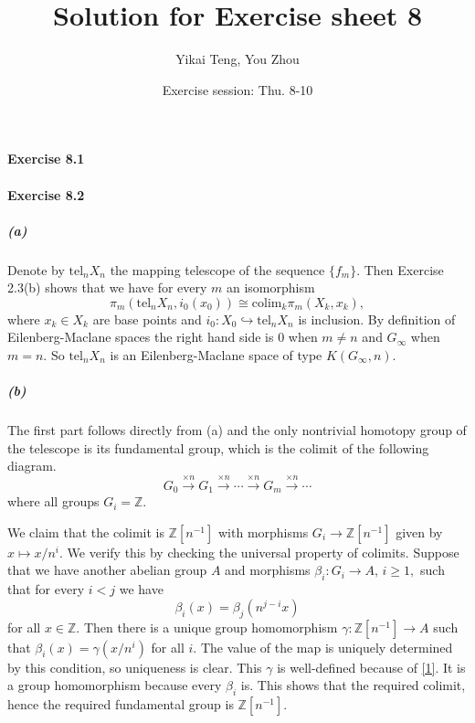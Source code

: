 \documentclass{article}
\title{Solution for Exercise sheet 8}
\author{Yikai Teng, You Zhou}
\date{Exercise session: Thu. 8-10}
\begin{document}
\maketitle
\paragraph{Exercise 8.1}

\paragraph{Exercise 8.2}
\subparagraph{(a)}Denote by $\text{tel}_nX_n$ the mapping telescope of the sequence $\{f_m\}.$ Then Exercise 2.3(b) shows that we have for every $m$ an isomorphism
\[\pi_m(\text{tel}_nX_n,i_0(x_0))\cong \text{colim}_k\pi_m(X_k,x_k),\]
where $x_k\in X_k$ are base points and $i_0\colon X_0\hookrightarrow\text{tel}_nX_n$ is inclusion. By definition of Eilenberg-Maclane spaces the right hand side is 0 when $m\neq n$ and $G_{\infty}$ when $m=n.$ So $\text{tel}_nX_n$ is an Eilenberg-Maclane space of type $K(G_{\infty},n).$ 

\subparagraph{(b)}The first part follows directly from (a) and the only nontrivial homotopy group of the telescope is its fundamental group, which is the colimit of the following diagram.
\[G_0\xrightarrow{\times n}G_1\xrightarrow{\times n}\cdots\xrightarrow{\times n}G_m\xrightarrow{\times n}\cdots\]
where all groups $G_i=\mathbb{Z}.$ 

We claim that the colimit is $\mathbb{Z}[n^{-1}]$ with morphisms $G_i\rightarrow\mathbb{Z}[n^{-1}]$ given by $x\mapsto x/n^i.$ We verify this by checking the universal property of colimits. Suppose that we have another abelian group $A$ and morphisms $\beta_i\colon G_i\rightarrow A,\,i\geq1,$ such that for every $i<j$ we have 
\begin{equation}\label{1}
\beta_i(x)=\beta_j(n^{j-i}x)
\end{equation}
for all $x\in\mathbb{Z}.$ Then there is a unique group homomorphism $\gamma\colon\mathbb{Z}[n^{-1}]\rightarrow A$ such that $\beta_i(x)=\gamma(x/n^{i})$ for all $i.$ The value of the map is uniquely determined by this condition, so uniqueness is clear. This $\gamma$ is well-defined because of \eqref{1}. It is a group homomorphism because every $\beta_i$ is. This shows that the required colimit, hence the required fundamental group is $\mathbb{Z}[n^{-1}].$
\end{document}
